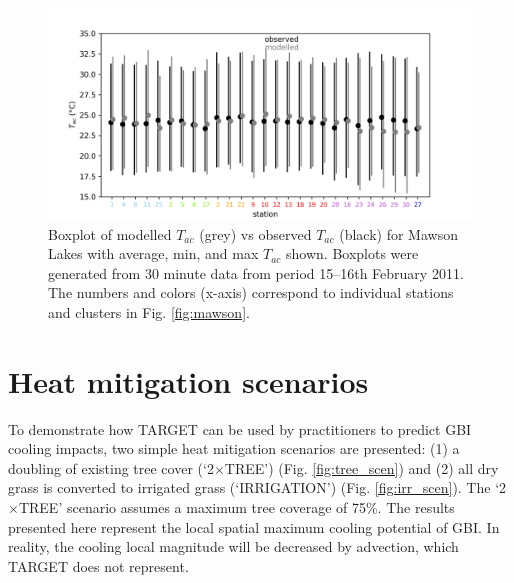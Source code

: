 \documentclass[gmd, manuscript]{copernicus}
\begin{document}
\begin{figure}[!htbp]

\includegraphics[width=1.0\textwidth,keepaspectratio]{figure8.png}

 \caption{Boxplot of modelled $T_{ac}$ (grey) vs observed $T_{ac}$ (black) for Mawson Lakes with average, min, and max $T_{ac}$ shown. Boxplots were generated from 30 minute data from period 15--16th February 2011.  The  numbers and colors (x-axis) correspond to individual stations and clusters in Fig. \ref{fig:mawson}.} \label{fig:MawsonBox}


\end{figure}

\section{Heat mitigation scenarios}

To demonstrate how TARGET can be used by practitioners  to predict GBI cooling impacts, two simple heat mitigation scenarios are presented: (1) a doubling of existing tree cover (`2$\times$TREE') (Fig. \ref{fig:tree_scen}) and (2) all dry grass is converted to irrigated grass (`IRRIGATION') (Fig. \ref{fig:irr_scen}). The `2$\times$TREE' scenario assumes a maximum tree coverage of 75\%.   The results presented here represent the local spatial maximum cooling potential of GBI. In reality, the cooling local magnitude will be decreased by advection, which TARGET does not represent. 
\end{document}
